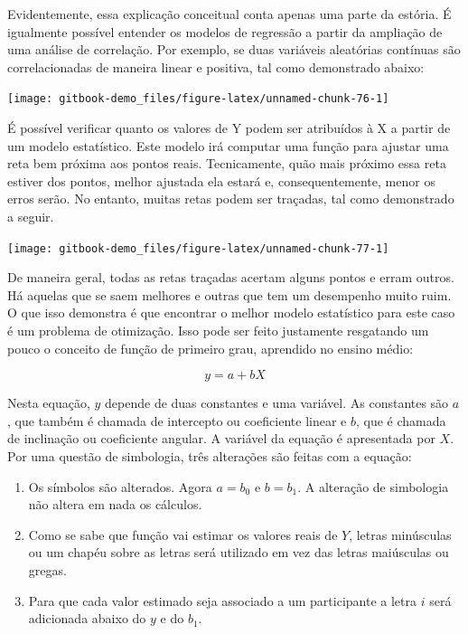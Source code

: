 \documentclass[
]{book}
\begin{document}
Evidentemente, essa explicação conceitual conta apenas uma parte da estória. É igualmente possível entender os modelos de regressão a partir da ampliação de uma análise de correlação. Por exemplo, se duas variáveis aleatórias contínuas são correlacionadas de maneira linear e positiva, tal como demonstrado abaixo:

\begin{center}\texttt{[image: gitbook-demo\_files/figure-latex/unnamed-chunk-76-1]} \end{center}

É possível verificar quanto os valores de Y podem ser atribuídos à X a partir de um modelo estatístico. Este modelo irá computar uma função para ajustar uma reta bem próxima aos pontos reais. Tecnicamente, quão mais próximo essa reta estiver dos pontos, melhor ajustada ela estará e, consequentemente, menor os erros serão. No entanto, muitas retas podem ser traçadas, tal como demonstrado a seguir.

\begin{center}\texttt{[image: gitbook-demo\_files/figure-latex/unnamed-chunk-77-1]} \end{center}

De maneira geral, todas as retas traçadas acertam alguns pontos e erram outros. Há aquelas que se saem melhores e outras que tem um desempenho muito ruim. O que isso demonstra é que encontrar o melhor modelo estatístico para este caso é um problema de otimização. Isso pode ser feito justamente resgatando um pouco o conceito de função de primeiro grau, aprendido no ensino médio:

\[y = a + bX\]

Nesta equação, \(y\) depende de duas constantes e uma variável. As constantes são \(a\), que também é chamada de intercepto ou coeficiente linear e \(b\), que é chamada de inclinação ou coeficiente angular. A variável da equação é apresentada por \(X\). Por uma questão de simbologia, três alterações são feitas com a equação:

\begin{enumerate}
\def\labelenumi{(\roman{enumi})}
\item
  Os símbolos são alterados. Agora \(a = b_0\) e \(b = b_1\). A alteração de simbologia não altera em nada os cálculos.
\item
  Como se sabe que função vai estimar os valores reais de \(Y\), letras minúsculas ou um chapéu sobre as letras será utilizado em vez das letras maiúsculas ou gregas.
\item
  Para que cada valor estimado seja associado a um participante a letra \(i\) será adicionada abaixo do \(y\) e do \(b_1\).
\end{enumerate}
\end{document}
